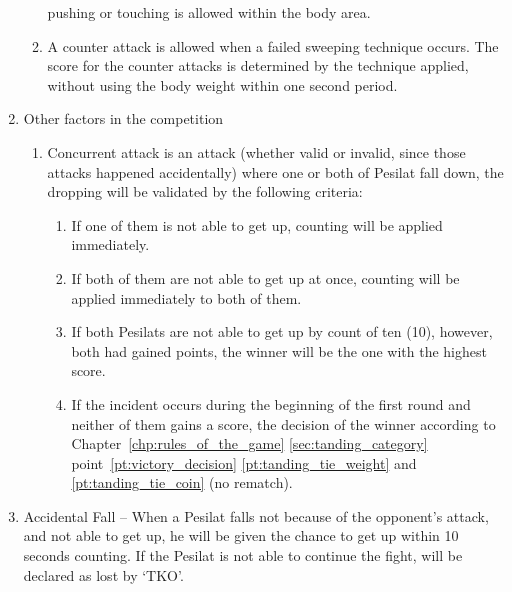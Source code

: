 \begin{legal}
\begin{legal}
\begin{legal}
\begin{enumerate}[label=\Alph*.]
\begin{enumerate}[label*=\arabic*.]
                        pushing or touching is allowed within the body area.
                    \item A counter attack is allowed when a failed sweeping technique
                        occurs. The score for the counter attacks is determined by the
                        technique applied, without using the body weight within one
                        second period.
                    \end{enumerate}
                \item Other factors in the competition
                    \begin{enumerate}[label*=\arabic*.]
                    \item Concurrent attack is an attack (whether valid or invalid, since
                        those attacks happened accidentally) where one or both of
                        Pesilat fall down, the dropping will be validated by the following criteria:
                        \begin{enumerate}[label*=\arabic*.]
                        \item If one of them is not able to get up, counting will be applied immediately.
                        \item If both of them are not able to get up at once, counting will be applied 
                            immediately to both of them.
                        \item If both Pesilats are not able to get up by count of ten (10),
                            however, both had gained points, the winner will be the one
                            with the highest score.
                        \item If the incident occurs during the beginning of the first
                            round and neither of them gains a score, the decision of the
                            winner according to Chapter~\ref{chp:rules_of_the_game} \ref{sec:tanding_category} point~\ref{pt:victory_decision} \ref{pt:tanding_tie_weight} and \ref{pt:tanding_tie_coin} (no rematch).%
                        \end{enumerate}
                    \end{enumerate}

                \item Accidental Fall – When a Pesilat falls not because of the opponent’s
                    attack, and not able to get up, he will be given the chance to get up
                    within 10 seconds counting. If the Pesilat is not able to continue the
                    fight, will be declared as lost by `TKO'.


\end{enumerate}
\end{legal}
\end{legal}
\end{legal}
